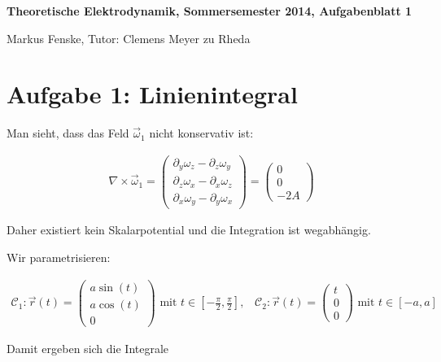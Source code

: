 \documentclass[a4paper,german,12pt,smallheadings]{scrartcl}
\begin{document}
\allowdisplaybreaks %
\begin{center}
\bfseries %
\sffamily %
\vspace{-40pt}
Theoretische Elektrodynamik, Sommersemester 2014, Aufgabenblatt 1

Markus Fenske, Tutor: Clemens Meyer zu Rheda
\vspace{-10pt}
\end{center}

\section*{Aufgabe 1: Linienintegral}

Man sieht, dass das Feld $\vec{\omega}_1$ nicht konservativ ist:

\begin{align}
  \nabla \times \vec{\omega}_1
= \begin{pmatrix} \partial_y \omega_z - \partial_z \omega_y \\ \partial_z \omega_x - \partial_x \omega_z \\ \partial_x \omega_y - \partial_y \omega_x \end{pmatrix}
= \begin{pmatrix} 0 \\ 0 \\ -2A \end{pmatrix}
\end{align}

Daher existiert kein Skalarpotential und die Integration ist wegabhängig.

Wir parametrisieren:

\begin{align}
  \mathcal{C}_1: \vec{r}(t) = \begin{pmatrix} a \sin(t) \\ a \cos(t) \\ 0\end{pmatrix} \text{ mit } t \in \left[-\frac{\pi}{2}, \frac{\pi}{2}\right], \;\;\;
  \mathcal{C}_2: \vec{r}(t) = \begin{pmatrix} t \\ 0 \\ 0\end{pmatrix} \text{ mit } t \in [-a,a]
\end{align}

Damit ergeben sich die Integrale
\end{document}
